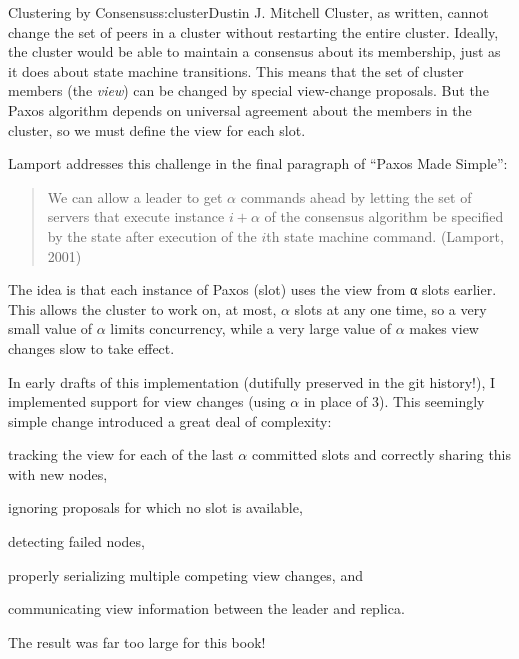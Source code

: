 \begin{aosachapter}{Clustering by Consensus}{s:cluster}{Dustin J. Mitchell}
Cluster, as written, cannot change the set of peers in a cluster without
restarting the entire cluster. Ideally, the cluster would be able to
maintain a consensus about its membership, just as it does about state
machine transitions. This means that the set of cluster members (the
\emph{view}) can be changed by special view-change proposals. But the
Paxos algorithm depends on universal agreement about the members in the
cluster, so we must define the view for each slot.

Lamport addresses this challenge in the final paragraph of ``Paxos Made
Simple'':

\begin{quote}
We can allow a leader to get $\alpha$ commands ahead by letting the set
of servers that execute instance $i+\alpha$ of the consensus algorithm
be specified by the state after execution of the $i$th state machine
command. (Lamport, 2001)
\end{quote}

The idea is that each instance of Paxos (slot) uses the view from α
slots earlier. This allows the cluster to work on, at most, $\alpha$
slots at any one time, so a very small value of $\alpha$ limits
concurrency, while a very large value of $\alpha$ makes view changes
slow to take effect.

In early drafts of this implementation (dutifully preserved in the git
history!), I implemented support for view changes (using $\alpha$ in
place of 3). This seemingly simple change introduced a great deal of
complexity:

\begin{aosaitemize}

\item
  tracking the view for each of the last $\alpha$ committed slots and
  correctly sharing this with new nodes,
\item
  ignoring proposals for which no slot is available,
\item
  detecting failed nodes,
\item
  properly serializing multiple competing view changes, and
\item
  communicating view information between the leader and replica.
\end{aosaitemize}

The result was far too large for this book!

\label{references}


\end{aosachapter}
